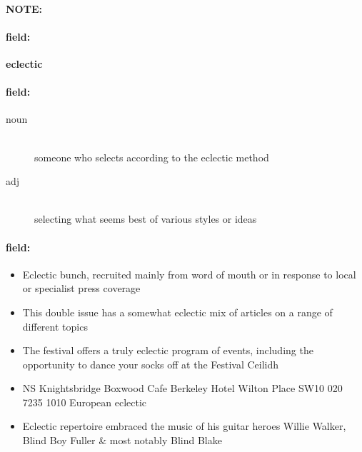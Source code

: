 \documentclass[12pt]{article}
\newenvironment{note}{\paragraph{NOTE:}}{}
\newenvironment{field}{\paragraph{field:}}{}
\begin{document}
\begin{note}
\begin{field}
\textbf{\large eclectic}
\end{field}


\begin{field}
\begin{description}
\item[noun] \hfill \\ 
someone who selects according to the eclectic method

\item[adj] \hfill \\ 
selecting what seems best of various styles or ideas

\end{description}
\end{field}

\begin{field}
\begin{itemize}
\item Eclectic bunch, recruited mainly from word of mouth or in response to local or specialist press coverage
\item This double issue has a somewhat eclectic mix of articles on a range of different topics
\item The festival offers a truly eclectic program of events, including the opportunity to dance your socks off at the Festival Ceilidh
\item NS Knightsbridge Boxwood Cafe Berkeley Hotel Wilton Place SW10 020 7235 1010    European eclectic
\item Eclectic repertoire embraced the music of his guitar heroes Willie Walker, Blind Boy Fuller & most notably Blind Blake
\end{itemize}
\end{field}
\end{note}
\end{document}
